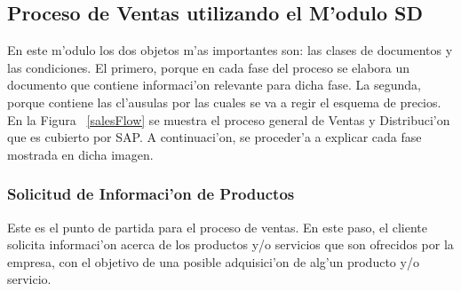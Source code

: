 \subsection{Proceso de Ventas utilizando el M'odulo SD}
	En este m'odulo los dos objetos m'as importantes son: las clases de documentos y las condiciones. El primero, porque en cada fase del proceso se elabora un documento que contiene informaci'on relevante para dicha fase. La segunda, porque contiene las cl'ausulas por las cuales se va a regir el esquema de precios.
	En la Figura ~\ref{salesFlow} se muestra el proceso general de Ventas y Distribuci'on que es cubierto por SAP. A continuaci'on, se proceder'a a explicar cada fase mostrada en dicha imagen.

\subsubsection{Solicitud de Informaci'on de Productos}
	Este es el punto de partida para el proceso de ventas. En este paso, el cliente solicita informaci'on acerca de los productos y/o servicios que son ofrecidos por la empresa, con el objetivo de una posible adquisici'on de alg'un producto y/o servicio.
	
